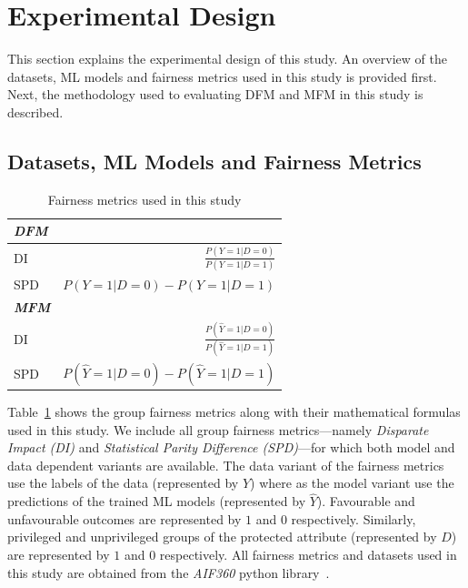 \documentclass{article}
\begin{document}


\section{Experimental Design}\label{sec:method}
This section explains the experimental design of this study. An
overview of the datasets, ML models and fairness metrics used in this
study is provided first. Next, the methodology used to evaluating DFM and
MFM in this study is described.

\subsection{Datasets, ML Models and Fairness Metrics}\label{sec:method-parameters}

\begin{table}
  \centering
  \begin{tabular}{l r}
    \toprule
    \textbf{\emph{DFM}}\\
    \midrule
    DI & \(\displaystyle \frac{P(Y=1|D=0)}{P(Y=1|D=1)}\)\\
    SPD & \(\displaystyle P(Y=1|D=0)-P(Y=1|D=1)\)\\
    \midrule
    \textbf{\emph{MFM}}\\
    \midrule
    DI & \(\displaystyle \frac{P(\hat{Y}=1|D=0)}{P(\hat{Y}=1|D=1)}\)\\
    SPD & \(\displaystyle P(\hat{Y}=1|D=0)-P(\hat{Y}=1|D=1)\)\\
    \bottomrule
  \end{tabular}
  \caption{Fairness metrics used in this study}
  \label{tab:fairness-metrics}
\end{table}

Table \ref{tab:fairness-metrics} shows the group fairness metrics
along with their mathematical formulas used in this study. We include
all group fairness metrics---namely \emph{Disparate Impact (DI)} and
\emph{Statistical Parity Difference (SPD)}---for which both model and
data dependent variants are available. The data variant of the
fairness metrics use the labels of the data (represented by $Y$) where
as the model variant use the predictions of the trained ML models
(represented by $\hat{Y}$). Favourable and unfavourable outcomes are
represented by $1$ and $0$ respectively. Similarly, privileged and
unprivileged groups of the protected attribute (represented by $D$)
are represented by $1$ and $0$ respectively. All fairness metrics and
datasets used in this study are obtained from the \emph{AIF360} python
library \cite{bellamy2019ai}.
\end{document}
